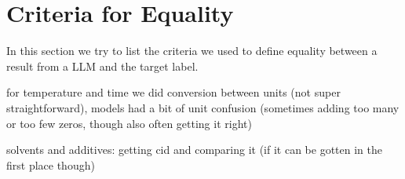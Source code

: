 \section{Criteria for Equality}\label{sec:equality}
In this section we try to list the criteria we used to define equality between a result from a \gls{LLM} and the target label.

for temperature and time we did conversion between units (not super straightforward), models had a bit of unit confusion
(sometimes adding too many or too few zeros, though also often getting it right)

solvents and additives: getting cid and comparing it (if it can be gotten in the first place though)

